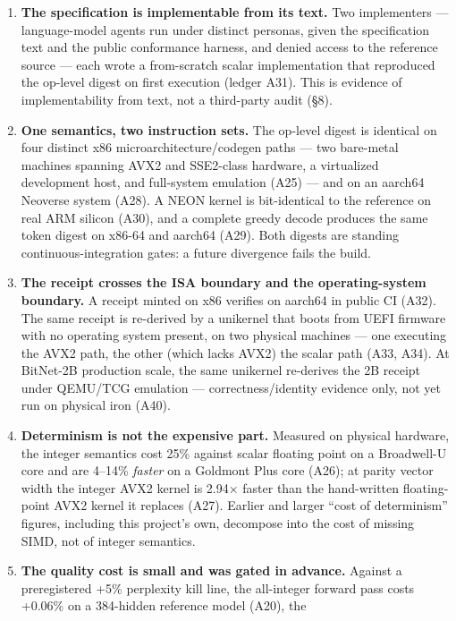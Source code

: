 \documentclass[11pt]{article}
\providecommand{\tightlist}{%
  \setlength{\itemsep}{0pt}\setlength{\parskip}{0pt}}
\begin{document}
\begin{enumerate}
\def\labelenumi{\arabic{enumi}.}
\tightlist
\item
  \textbf{The specification is implementable from its text.} Two implementers --- language-model agents
  run under distinct personas, given the specification text and the public conformance harness,
  and denied access to the reference source --- each wrote a from-scratch scalar implementation
  that reproduced the op-level digest on first execution (ledger A31). This is evidence of
  implementability from text, not a third-party audit (§8).
\item
  \textbf{One semantics, two instruction sets.} The op-level digest is identical on four distinct x86
  microarchitecture/codegen paths --- two bare-metal machines spanning AVX2 and SSE2-class hardware,
  a virtualized development host, and full-system emulation (A25) --- and on an aarch64 Neoverse
  system (A28).
  A NEON kernel is bit-identical to the reference on real ARM silicon (A30), and a complete
  greedy decode produces the same token digest on x86-64 and aarch64 (A29). Both digests are
  standing continuous-integration gates: a future divergence fails the build.
\item
  \textbf{The receipt crosses the ISA boundary and the operating-system boundary.} A receipt minted
  on x86 verifies on aarch64 in public CI (A32). The same receipt is re-derived by a unikernel
  that boots from UEFI firmware with no operating system present, on two physical machines ---
  one executing the AVX2 path, the other (which lacks AVX2) the scalar path (A33, A34). At
  BitNet-2B production scale, the same unikernel re-derives the 2B receipt under QEMU/TCG
  emulation --- correctness/identity evidence only, not yet run on physical iron (A40).
\item
  \textbf{Determinism is not the expensive part.} Measured on physical hardware, the integer semantics
  cost 25\% against scalar floating point on a Broadwell-U core and are 4--14\% \emph{faster} on a
  Goldmont Plus core (A26); at parity vector width the integer AVX2 kernel is 2.94× faster than
  the hand-written floating-point AVX2 kernel it replaces (A27). Earlier and larger ``cost of
  determinism'' figures, including this project's own, decompose into the cost of missing SIMD,
  not of integer semantics.
\item
  \textbf{The quality cost is small and was gated in advance.} Against a preregistered +5\% perplexity
  kill line, the all-integer forward pass costs +0.06\% on a 384-hidden reference model (A20), the

\end{enumerate}
\end{document}

